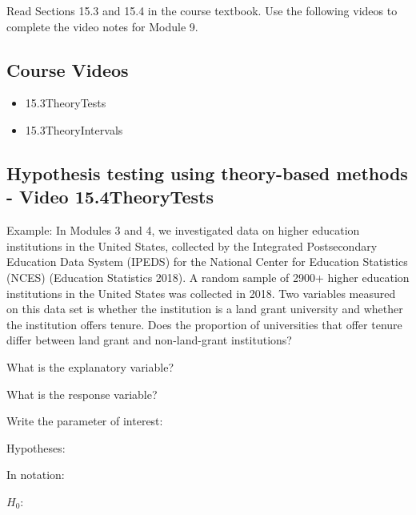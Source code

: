 \documentclass[
]{report}
\begin{document}
Read Sections 15.3 and 15.4 in the course textbook. Use the following videos to complete the video notes for Module 9.

\subsection{Course Videos}\label{course-videos-7}

\begin{itemize}
\item
  15.3TheoryTests
\item
  15.3TheoryIntervals
\end{itemize}


\subsection*{Hypothesis testing using theory-based methods - Video 15.4TheoryTests}\label{hypothesis-testing-using-theory-based-methods---video-15.4theorytests}

Example: In Modules 3 and 4, we investigated data on higher education institutions in the United States, collected by the Integrated Postsecondary Education Data System (IPEDS) for the National Center for Education Statistics (NCES) (Education Statistics 2018). A random sample of 2900+ higher education institutions in the United States was collected in 2018. Two variables measured on this data set is whether the institution is a land grant university and whether the institution offers tenure. Does the proportion of universities that offer tenure differ between land grant and non-land-grant institutions?

What is the explanatory variable?

\vspace{0.2in}

What is the response variable?

\vspace{0.2in}

Write the parameter of interest:

\vspace{0.8in}

Hypotheses:

In notation:

\(H_0:\)

\vspace{0.2in}
\end{document}
